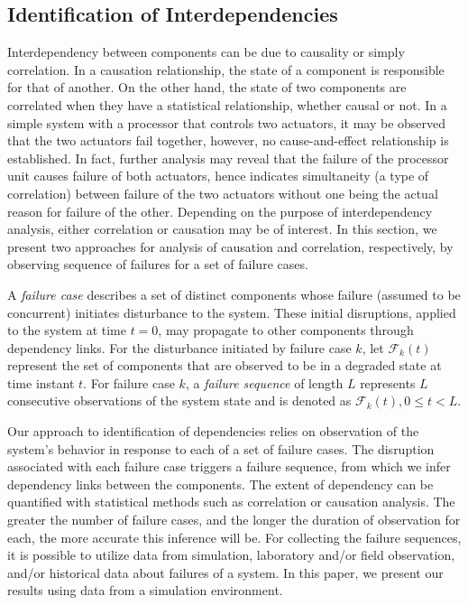 \documentclass[12pt]{elsarticle}
\begin{document}
\subsection{Identification of Interdependencies}
\label{sec:analysis:iden}
Interdependency between components can be due to causality or simply correlation. In a causation relationship, the state of a component is responsible for that of another. On the other hand, the state of two components are correlated when they have a statistical relationship, whether causal or not. In a simple system with a processor that controls two actuators, it may be observed that the two actuators fail together, however, no cause-and-effect relationship is established. In fact, further analysis may reveal that the failure of the processor unit causes failure of both actuators, hence indicates simultaneity (a type of correlation) between failure of the two actuators without one being the actual reason for failure of the other. Depending on the purpose of interdependency analysis, either correlation or causation may be of interest. In this section, we present two approaches for analysis of causation and correlation, respectively, by observing sequence of failures for a set of failure cases.

A \emph{failure case} describes a set of distinct components whose failure (assumed to be concurrent) initiates disturbance to the system. These initial disruptions, applied to the system at time $t=0$, may propagate to other components through dependency links. For the disturbance initiated by failure case $k$, let $\mathcal{F}_{k}(t)$ represent the set of components that are observed to be in a degraded state at time instant $t$. For failure case $k$, a \emph{failure sequence} of length $L$ represents $L$ consecutive observations of the system state and is denoted as $\mathcal{F}_{k}(t), 0 \leq t < L$.

Our approach to identification of dependencies relies on observation of the system's behavior in response to each of a set of failure cases. The disruption associated with each failure case triggers a failure sequence, from which we infer dependency links between the components. The extent of dependency can be quantified with statistical methods such as correlation or causation analysis. The greater the number of failure cases, and the longer the duration of observation for each, the more accurate this inference will be. For collecting the failure sequences, it is possible to utilize data from simulation, laboratory and/or field observation, and/or historical data about failures of a system. In this paper, we present our results using data from a simulation environment.
\end{document}
